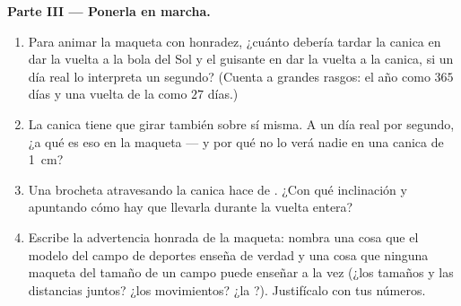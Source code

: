\begin{problem}
\medskip\noindent\textbf{Parte III --- Ponerla en marcha.}
\begin{enumerate}[resume]
  \item Para animar la maqueta con honradez, ¿cuánto debería tardar
        la canica en dar la vuelta a la bola del Sol y el guisante en
        dar la vuelta a la canica, si un día real lo interpreta un
        segundo? (Cuenta a grandes rasgos: el año como $365$ días y
        una vuelta de la  como $27$ días.)
  \item La canica tiene que girar también sobre sí misma. A un día
        real por segundo, ¿a qué  es eso en la maqueta --- y
        por qué no lo verá nadie en una canica de \qty{1}{cm}?
  \item Una brocheta atravesando la canica hace de . ¿Con qué
        inclinación y apuntando cómo hay que llevarla durante la
        vuelta entera?
  \item Escribe la advertencia honrada de la maqueta: nombra una cosa
        que el modelo del campo de deportes enseña de verdad y una
        cosa que ninguna maqueta del tamaño de un campo puede enseñar
        a la vez (¿los tamaños y las distancias juntos? ¿los
        movimientos? ¿la ?). Justifícalo con tus números.
\end{enumerate}
\end{problem}
